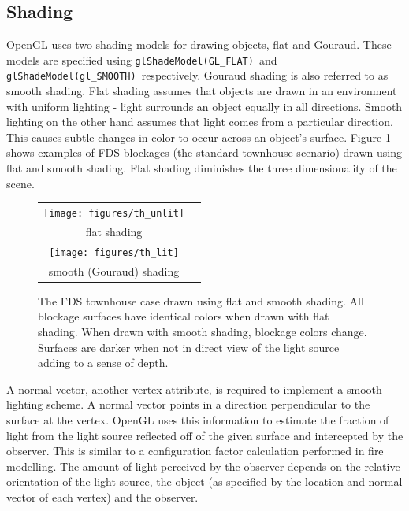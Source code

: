 \documentclass[11pt,twoside]{book}
\newcommand{\figoptions}{htp}
\begin{document}
\subsection{Shading} OpenGL uses two shading models for drawing
objects, flat and Gouraud.  These models are specified
using {\tt glShadeModel(GL\_FLAT)}\ and {\tt glShadeModel(gl\_SMOOTH)}\
respectively.
Gouraud shading is also
referred to as smooth shading.  Flat shading assumes that objects
are drawn in an environment with uniform lighting - light
surrounds an object equally in all directions. Smooth lighting on
the other hand assumes that light comes from a particular
direction.  This causes subtle changes in color to occur across an
object's surface. Figure \ref{figlighting} shows examples of FDS
blockages (the standard townhouse scenario) drawn using flat and
smooth shading. Flat shading diminishes the three dimensionality of
the scene.
\begin{figure}[\figoptions]
\begin{center}
\begin{tabular}{cc}
\texttt{[image: figures/th\_unlit]}\\
flat shading\\
\texttt{[image: figures/th\_lit]}\\
smooth (Gouraud) shading\\
\end{tabular}
\end{center}
\caption [The FDS townhouse case drawn using flat and smooth
shading.] { The FDS townhouse case drawn using flat and smooth
shading. All blockage surfaces have identical colors when drawn
with flat shading.  When drawn with smooth shading, blockage
colors change.  Surfaces are darker when not in direct view of the
light source adding to a sense of depth. } \label{figlighting}
\end{figure}

A normal vector, another vertex attribute, is required to
implement a smooth lighting scheme. A normal vector points in a
direction perpendicular to the surface at the vertex. OpenGL uses
this information to estimate the fraction of light from the light
source reflected off of the given surface and intercepted by the
observer.  This is similar to a configuration factor calculation
performed in fire modelling.  The amount of light perceived by the
observer depends on the relative orientation of the light source,
the object (as specified by the location and normal vector of each
vertex) and the observer.
\end{document}
